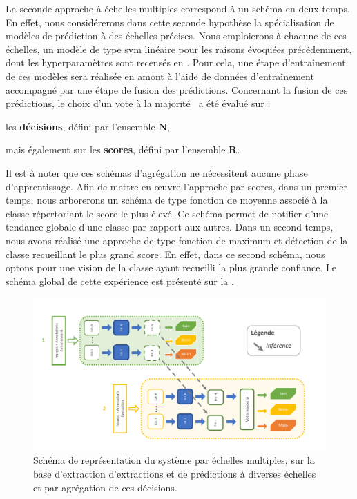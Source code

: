 La seconde approche à échelles multiples correspond à un schéma en deux temps. En effet, nous considérerons dans cette seconde hypothèse la spécialisation de modèles de prédiction à des échelles précises. Nous emploierons à chacune de ces échelles, un modèle de type \gls{svm} linéaire pour les raisons évoquées précédemment, dont les hyperparamètres sont recensés en . Pour cela, une étape d'entraînement de ces modèles sera réalisée en amont à l'aide de données d'entraînement accompagné par une étape de fusion des prédictions. Concernant la fusion de ces prédictions, le choix d'un vote à la majorité~\cite{Kam1994,Lam1997} a été évalué sur : 
\begin{inlinerate}
    \item les \textbf{décisions}, défini par l'ensemble $\mathbf{N}$,
    \item mais également sur les \textbf{scores}, défini par l'ensemble $\mathbf{R}$.
\end{inlinerate}
Il est à noter que ces schémas d'agrégation ne nécessitent aucune phase d'apprentissage. Afin de mettre en œuvre l'approche par scores, dans un premier temps, nous arborerons un schéma de type fonction de moyenne associé à la classe répertoriant le score le plus élevé. Ce schéma permet de notifier d'une tendance globale d'une classe par rapport aux autres. Dans un second temps, nous avons réalisé une approche de type fonction de maximum et détection de la classe recueillant le plus grand score. En effet, dans ce second schéma, nous optons pour une vision de la classe ayant recueilli la plus grande confiance. Le schéma global de cette expérience est présenté sur la .\par

\begin{figure}[H]
    \centering
    \includegraphics[width=\linewidth]{contents/chapter_5/resources/scheme_image_improvement_multiscale_decision.pdf}
    \caption{Schéma de représentation du système par échelles multiples, sur la base d'extraction d'extractions et de prédictions à diverses échelles et par agrégation de ces décisions.}
    \label{fig:scheme_image_improvement_multiscale_decision}
\end{figure}\par

